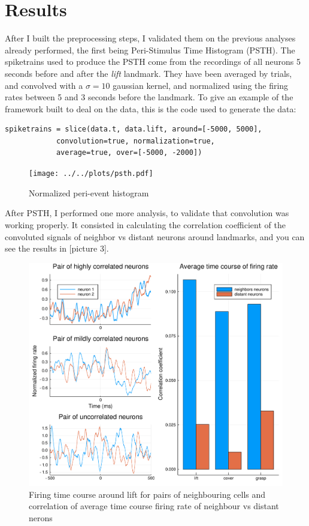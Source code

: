 \section{Results}

After I built the preprocessing steps, I validated them on the previous analyses already performed, the first being Peri-Stimulus Time Histogram (PSTH). The spiketrains used to produce the PSTH come from the recordings of all neurons 5 seconds before and after the \emph{lift} landmark. They have been averaged by trials, and convolved with a $\sigma=10$ gaussian kernel, and normalized using the firing rates between 5 and 3 seconds before the landmark. To give an example of the framework built to deal on the data, this is the code used to generate the data:
\begin{lstlisting}[frame=single]
spiketrains = slice(data.t, data.lift, around=[-5000, 5000], 
		    convolution=true, normalization=true, 
		    average=true, over=[-5000, -2000])
\end{lstlisting}
\begin{figure}[h]
	\centering
	\texttt{[image: ../../plots/psth.pdf]}
	\caption{Normalized peri-event histogram}
	\label{fig:psth}
\end{figure}


After PSTH, I performed one more analysis, to validate that convolution was working properly. It consisted in calculating the correlation coefficient of the convoluted signals of neighbor vs distant neurons around landmarks, and you can see the results in [picture 3].

\begin{figure}[h!]
	\centering
	\includegraphics[scale=0.5]{../../plots/corr-coef.pdf}
	\caption{Firing time course around lift for pairs of neighbouring cells and correlation of average time course firing rate of neighbour vs distant nerons}
	\label{fig:corr-coeff}
\end{figure}


